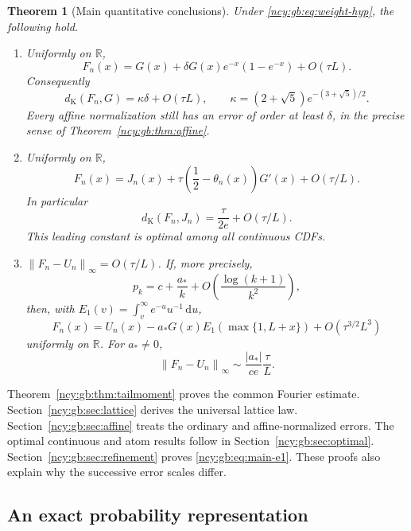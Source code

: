 \documentclass[11pt,letterpaper]{article}
\numberwithin{equation}{section}
\newtheorem{theorem}{Theorem}[section]
\theoremstyle{remark}\newtheorem{remark}[theorem]{Remark}
\newcommand{\dd}{\,\mathrm d}
\theoremstyle{definition}\newtheorem{definition}[theorem]{Definition}\theoremstyle{plain}
\newcommand{\R}{\mathbb R}
\newcommand{\norminf}[1]{\left\lVert #1\right\rVert_\infty}
\newcommand{\DK}{d_{\mathrm K}}
\begin{document}
\begin{theorem}[Main quantitative conclusions]\label{ncy:gb:thm:main}
Under \eqref{ncy:gb:eq:weight-hyp}, the following hold.
\begin{enumerate}
\item Uniformly on \(\R\),
\begin{equation}\label{ncy:gb:eq:main-leading}
 F_n(x)=G(x)+\delta G(x)e^{-x}(1-e^{-x})+O(\tau L).
\end{equation}
Consequently
\[
 \DK(F_n,G)=\kappa\delta+O(\tau L),
 \qquad
 \kappa=(2+\sqrt5)e^{-(3+\sqrt5)/2}.
\]
Every affine normalization still has an error of order at least
\(\delta\), in the precise sense of Theorem~\ref{ncy:gb:thm:affine}.

\item Uniformly on \(\R\),
\begin{equation}\label{ncy:gb:eq:main-lattice}
 F_n(x)=J_n(x)+
 \tau\left(\frac12-\theta_n(x)\right)G'(x)+O(\tau/L).
\end{equation}
In particular
\[
 \DK(F_n,J_n)=\frac{\tau}{2e}+O(\tau/L).
\]
This leading constant is optimal among all continuous CDFs.

\item \(\norminf{F_n-U_n}=O(\tau/L)\).
If, more precisely,
\begin{equation}\label{ncy:gb:eq:refined-hyp}
 p_k=c+\frac{a_*}{k}+O\left(\frac{\log(k+1)}{k^2}\right),
\end{equation}
then, with
\(E_1(v)=\int_v^\infty e^{-u}u^{-1}\dd u\),
\begin{equation}\label{ncy:gb:eq:main-e1}
 F_n(x)=U_n(x)
 -a_*G(x)E_1(\max\{1,L+x\})
 +O(\tau^{3/2}L^3)
\end{equation}
uniformly on \(\R\).
For \(a_*\ne0\),
\[
 \norminf{F_n-U_n}\sim\frac{|a_*|}{ce}\frac{\tau}{L}.
\]
\end{enumerate}
\end{theorem}

Theorem~\ref{ncy:gb:thm:tailmoment} proves the common Fourier estimate.
Section~\ref{ncy:gb:sec:lattice} derives the universal lattice law.
Section~\ref{ncy:gb:sec:affine} treats the ordinary and affine-normalized
errors. The optimal continuous and atom results follow in
Section~\ref{ncy:gb:sec:optimal}. Section~\ref{ncy:gb:sec:refinement} proves
\eqref{ncy:gb:eq:main-e1}. These proofs also explain why the successive
error scales differ.

\subsection{An exact probability representation}
\end{document}

